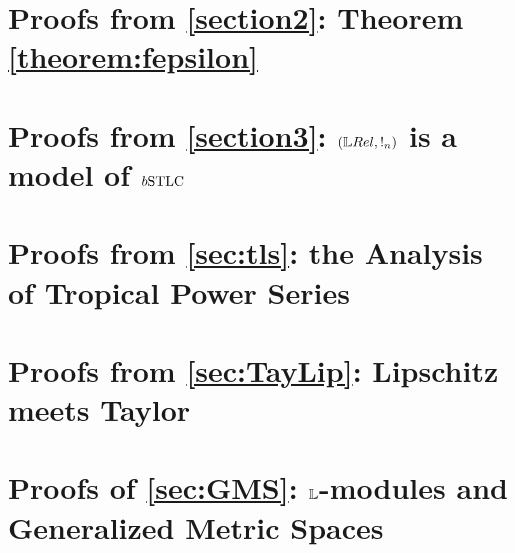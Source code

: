 \documentclass[a4paper,english, UKenglish,cleveref, autoref, thm-restate]{lipics-v2021}
\begin{document}




\appendix

\section{Proofs from \autoref{section2}: Theorem \ref{theorem:fepsilon}}


\section{Proofs from \autoref{section3}: $(\LREL, !_{n})$ is a model of $\BSTLC$}



\section{Proofs from \autoref{sec:tls}: the Analysis of Tropical Power Series}\label{appsec:tls}


\section{Proofs from \autoref{sec:TayLip}: Lipschitz meets Taylor}



\section{Proofs of \autoref{sec:GMS}: $\mathbb{L}$-modules and Generalized Metric Spaces}

\end{document}
